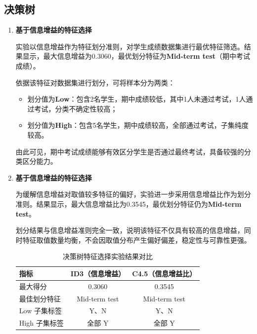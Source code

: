 \documentclass{SCNU_Experimental_Report}
\begin{document}
\subsection{决策树}
\begin{enumerate}
    \item \textbf{基于信息增益的特征选择}

          实验以信息增益作为特征划分准则，对学生成绩数据集进行最优特征筛选。结果显示，最大信息增益为0.3060，最优划分特征为\textbf{Mid-term test}（期中考试成绩）。

          依据该特征对数据集进行划分，可将样本分为两类：
          \begin{itemize}
              \item 划分值为\textbf{Low}：包含2名学生，期中成绩较低，其中1人未通过考试，1人通过考试，分类不确定性较高；
              \item 划分值为\textbf{High}：包含5名学生，期中成绩较高，全部通过考试，子集纯度较高。
          \end{itemize}
          由此可见，期中考试成绩能够有效区分学生是否通过最终考试，具备较强的分类区分能力。

    \item \textbf{基于信息增益的特征选择}

          为缓解信息增益对取值较多特征的偏好，实验进一步采用信息增益比作为划分准则。结果显示，最大信息增益比为0.3545，最优划分特征仍为\textbf{Mid-term test}。

          划分结果与信息增益准则完全一致，说明该特征不仅具有较高的信息增益，同时特征取值数量均衡，不会因取值分布产生偏好偏差，稳定性与可靠性更强。
          \begin{table}[H]
              \centering
              \caption{决策树特征选择实验结果对比}
              \label{tab:dt_compare}
              \small
              \begin{tabular}{lcc}
                  \toprule
                  指标        & ID3（信息增益）     & C4.5（信息增益比）   \\
                  \midrule
                  最大得分      & 0.3060        & 0.3545        \\
                  最佳划分特征    & Mid-term test & Mid-term test \\
                  Low 子集标签  & Y、N           & Y、N           \\
                  High 子集标签 & 全部 Y          & 全部 Y          \\
                  \bottomrule
              \end{tabular}
          \end{table}
\end{enumerate}
\end{document}

